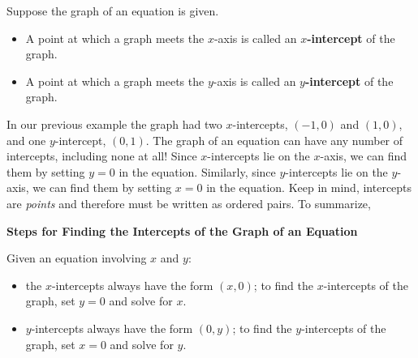 \medskip

\colorbox{ResultColor}{\bbm

\smallskip

\begin{defn}  Suppose the graph of an equation is given.

\label{interceptsdefn}

\begin{itemize}

\item  A point at which a graph meets the $x$-axis is called an  \textbf{\boldmath $x$-intercept} of the graph.

\item  A point at which a graph meets the $y$-axis is called an  \textbf{\boldmath $y$-intercept} of the graph.

\smallskip

\end{itemize}

\end{defn}

\ebm}

\medskip

In our previous example the graph had two $x$-intercepts, $(-1,0)$ and $(1,0)$, and one $y$-intercept, $(0,1)$.  The graph of an equation can have any number of intercepts, including none at all!  Since $x$-intercepts lie on the $x$-axis, we can find them by setting $y = 0$ in the equation.  Similarly, since $y$-intercepts lie on the $y$-axis, we can find them by setting $x = 0$ in the equation.  Keep in mind, intercepts are \emph{points} and therefore must be written as ordered pairs.  To summarize,

\medskip

\colorbox{ResultColor}{\bbm

\smallskip

\centerline{\textbf{Steps for Finding the Intercepts of the Graph of an Equation}}

\medskip

\hspace{.17in} Given an equation involving $x$ and $y$: 

\begin{itemize}

\item the $x$-intercepts always have the form $(x,0)$;  to find the $x$-intercepts of the graph, set $y=0$ and solve for $x$.  

\item   $y$-intercepts always have the form $(0,y)$; to find the $y$-intercepts of the graph, set $x=0$ and solve for $y$. 

\smallskip

\end{itemize}

\ebm}

